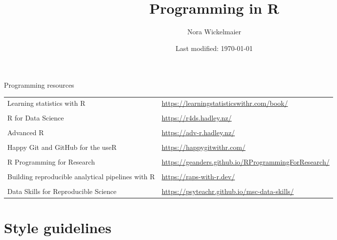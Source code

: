 \documentclass[aspectratio=169]{beamer}
\title{Programming in R}
\author{Nora Wickelmaier}
\date{Last modified: \today}
\begin{document}
\begin{frame}{}
\thispagestyle{empty}
\titlepage
\end{frame}

\begin{frame}[fragile]{Programming resources}
  \footnotesize
  \begin{tabular}{ll}
    Learning statistics with R  & {\url{https://learningstatisticswithr.com/book/}} \\
    &\\
    R for Data Science & {\url{https://r4ds.hadley.nz/}} \\
    &\\
    Advanced R  & {\url{https://adv-r.hadley.nz/}} \\
    &\\
    Happy Git and GitHub for the useR & {\url{https://happygitwithr.com/}} \\
    &\\
    R Programming for Research & {\url{https://geanders.github.io/RProgrammingForResearch/}} \\
    &\\
    Building reproducible analytical pipelines with R & {\url{https://raps-with-r.dev/}} \\
    &\\
    Data Skills for Reproducible Science & {\url{https://psyteachr.github.io/msc-data-skills/}} \\
  \end{tabular}
\end{frame}

\section{Style guidelines}
\end{document}
